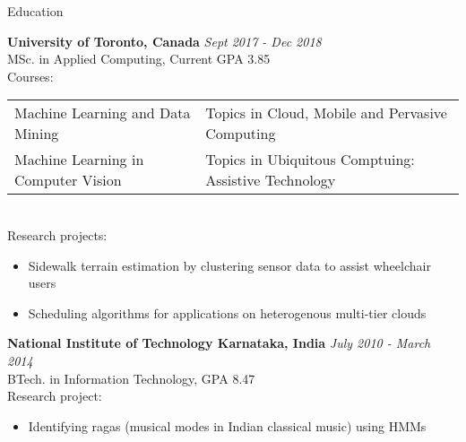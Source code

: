 \documentclass{resume} %
\begin{document}

\begin{rSection}{Education}

{\bf University of Toronto, Canada} \hfill {\em Sept 2017 - Dec 2018} \\ 
MSc. in Applied Computing, Current GPA 3.85 \\
Courses: \smallskip \\
  \begin{tabular}{ l l }
  Machine Learning and Data Mining & Topics in Cloud, Mobile and Pervasive Computing \\
  Machine Learning in Computer Vision & Topics in Ubiquitous Comptuing: Assistive Technology
  \end{tabular} \smallskip \\
Research projects:
  \begin{itemize}
    \item Sidewalk terrain estimation by clustering sensor data to assist wheelchair users
    \item Scheduling algorithms for applications on heterogenous multi-tier clouds
  \end{itemize}


{\bf National Institute of Technology Karnataka, India} \hfill {\em July 2010 - March 2014} \\ 
BTech. in Information Technology, GPA 8.47 \\
Research project:
  \begin{itemize}
    \item  Identifying ragas (musical modes in Indian classical music) using HMMs
  \end{itemize}


\end{rSection}

\end{document}
